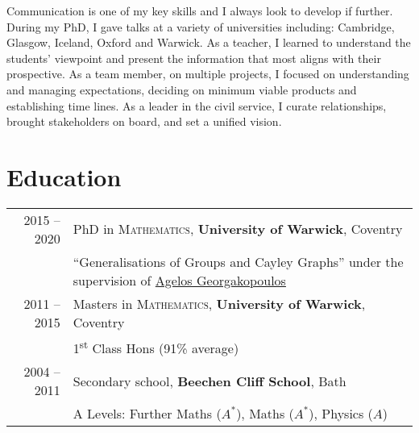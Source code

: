 \documentclass[a4paper,10pt]{article}
\begin{document}
Communication is one of my key skills and I always look to develop if further. During my PhD, I gave talks at a variety of universities including: Cambridge, Glasgow, Iceland, Oxford and Warwick. As a teacher, I learned to understand the students' viewpoint and present the information that most aligns with their prospective. As a team member, on multiple projects, I focused on understanding and managing expectations, deciding on minimum viable products and establishing time lines. As a leader in the civil service, I curate relationships, brought stakeholders on board, and set a unified vision.

\section{Education}
\begin{tabular}{rl}	
	\textsc{} 2015 -- 2020 & PhD in \textsc{Mathematics}, \textbf{University of Warwick}, Coventry\\
	& ``Generalisations of Groups and Cayley Graphs'' under the supervision of \href{https://homepages.warwick.ac.uk/~maslar/}{Agelos Georgakopoulos}\\
	\textsc{} 2011 -- 2015& Masters in \textsc{Mathematics}, \textbf{University of Warwick}, Coventry\\
	& 1\textsuperscript{st} Class Hons (91\% average)\\
	\textsc{} 2004 -- 2011& Secondary school, \textbf{Beechen Cliff School}, Bath\\
	&  A Levels: Further Maths ($A^{\ast}$), Maths ($A^{\ast}$), Physics ($A$)\\
\end{tabular}
\end{document}
